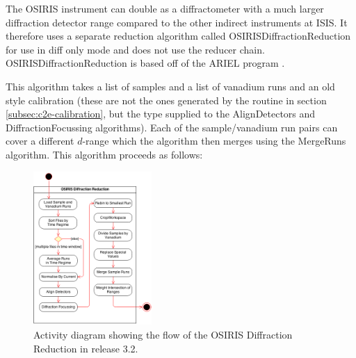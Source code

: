 \documentclass[paper=a4, fontsize=11pt]{scrartcl}	%
\numberwithin{equation}{section}															%
\numberwithin{figure}{section}																%
\numberwithin{table}{section}																%
\begin{document}
The OSIRIS instrument can double as a diffractometer with a much larger diffraction detector range compared to the other indirect instruments at ISIS. It therefore uses a separate reduction algorithm called OSIRISDiffractionReduction for use in diff only mode and does not use the reducer chain. OSIRISDiffractionReduction is based off of the ARIEL program \cite{pradaelli2000ariel}. 

This algorithm takes a list of samples and a list of vanadium runs and an old style calibration (these are not the ones generated by the routine in section \ref{subsec:c2e-calibration}, but the type supplied to the AlignDetectors and DiffractionFocussing algorithms). Each of the sample/vanadium run pairs can cover a different $d$-range which the algorithm then merges using the MergeRuns algorithm. This algorithm proceeds as follows:

\begin{figure}[H]
\centering
\includegraphics[width=0.4\textwidth]{img/uml/activity_diagrams/OSIRISDiffractionReduction_activity.png}
\caption{Activity diagram showing the flow of the OSIRIS Diffraction Reduction in release 3.2.}
\label{fig:c2e-class-diagram}
\end{figure}
\end{document}
